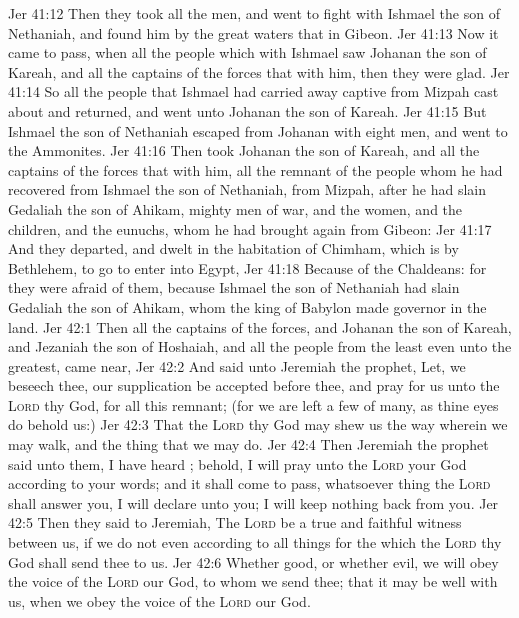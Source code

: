 \vs Jer 41:12 Then they took all the men, and went to fight with Ishmael the son of Nethaniah, and found him by the great waters that  in Gibeon.
\vs Jer 41:13 Now it came to pass,  when all the people which  with Ishmael saw Johanan the son of Kareah, and all the captains of the forces that  with him, then they were glad.
\vs Jer 41:14 So all the people that Ishmael had carried away captive from Mizpah cast about and returned, and went unto Johanan the son of Kareah.
\vs Jer 41:15 But Ishmael the son of Nethaniah escaped from Johanan with eight men, and went to the Ammonites.
\vs Jer 41:16 Then took Johanan the son of Kareah, and all the captains of the forces that  with him, all the remnant of the people whom he had recovered from Ishmael the son of Nethaniah, from Mizpah, after  he had slain Gedaliah the son of Ahikam,  mighty men of war, and the women, and the children, and the eunuchs, whom he had brought again from Gibeon:
\vs Jer 41:17 And they departed, and dwelt in the habitation of Chimham, which is by Bethlehem, to go to enter into Egypt,
\vs Jer 41:18 Because of the Chaldeans: for they were afraid of them, because Ishmael the son of Nethaniah had slain Gedaliah the son of Ahikam, whom the king of Babylon made governor in the land.
\vs Jer 42:1 Then all the captains of the forces, and Johanan the son of Kareah, and Jezaniah the son of Hoshaiah, and all the people from the least even unto the greatest, came near,
\vs Jer 42:2 And said unto Jeremiah the prophet, Let, we beseech thee, our supplication be accepted before thee, and pray for us unto the \textsc{Lord} thy God,  for all this remnant; (for we are left  a few of many, as thine eyes do behold us:)
\vs Jer 42:3 That the \textsc{Lord} thy God may shew us the way wherein we may walk, and the thing that we may do.
\vs Jer 42:4 Then Jeremiah the prophet said unto them, I have heard ; behold, I will pray unto the \textsc{Lord} your God according to your words; and it shall come to pass,  whatsoever thing the \textsc{Lord} shall answer you, I will declare  unto you; I will keep nothing back from you.
\vs Jer 42:5 Then they said to Jeremiah, The \textsc{Lord} be a true and faithful witness between us, if we do not even according to all things for the which the \textsc{Lord} thy God shall send thee to us.
\vs Jer 42:6 Whether  good, or whether  evil, we will obey the voice of the \textsc{Lord} our God, to whom we send thee; that it may be well with us, when we obey the voice of the \textsc{Lord} our God.
